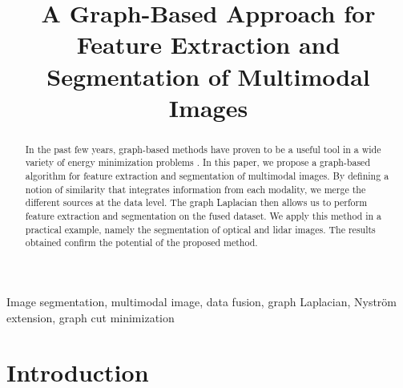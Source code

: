 \documentclass{article}
\title{A Graph-Based Approach for Feature Extraction and Segmentation of Multimodal Images}
\begin{document}
% 
\maketitle
%
\begin{abstract}
  In the past few years, graph-based methods have proven to be a useful tool in
  a wide variety of energy minimization problems \cite{1262177}.  In this paper,
  we propose a graph-based algorithm for feature extraction and segmentation of
  multimodal images. By defining a notion of similarity that integrates
  information from each modality, we merge the different sources at the data
  level. The graph Laplacian then allows us to perform feature extraction and
  segmentation on the fused dataset. We apply this method in a practical
  example, namely the segmentation of optical and lidar images. The results
  obtained confirm the potential of the proposed method.
\end{abstract}

\begin{keywords}
  Image segmentation, multimodal image, data fusion, graph Laplacian,
  Nystr\"{o}m extension, graph cut minimization
\end{keywords}

\section{Introduction}
\label{sec:intro}

\end{document}
